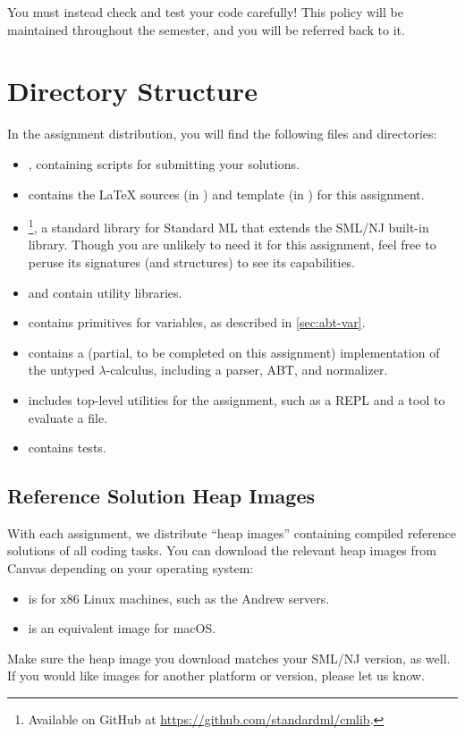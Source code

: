 \documentclass[11pt]{article}
\begin{document}
You must instead check and test your code carefully!
This policy will be maintained throughout the semester, and you will be referred back to it.

\section{Directory Structure}

In the assignment distribution, you will find the following files and directories:
\begin{itemize}
  \item
    , containing scripts for submitting your solutions.

  \item
     contains the \LaTeX{} sources (in ) and template (in ) for this assignment.

  \item
    \footnote{Available on GitHub at \url{https://github.com/standardml/cmlib}.}, a standard library for Standard ML that extends the SML/NJ built-in library.
    Though you are unlikely to need it for this assignment, feel free to peruse its signatures (and structures) to see its capabilities.

  \item
     and  contain utility libraries.

  \item
     contains primitives for variables, as described in \cref{sec:abt-var}.

  \item
     contains a (partial, to be completed on this assignment) implementation of the untyped $\lambda$-calculus, including a parser, ABT, and normalizer.

  \item
     includes top-level utilities for the assignment, such as a REPL and a tool to evaluate a file.

  \item
     contains tests.
\end{itemize}

\subsection{Reference Solution Heap Images}\label{sec:heapimage}

With each assignment, we distribute ``heap images'' containing compiled reference solutions of all coding tasks.
You can download the relevant heap images from Canvas depending on your operating system:
\begin{itemize}
  \item {} is for x86 Linux machines, such as the Andrew servers.
  \item {} is an equivalent image for macOS.
\end{itemize}
Make sure the heap image you download matches your SML/NJ version, as well.
If you would like images for another platform or version, please let us know.
\end{document}
